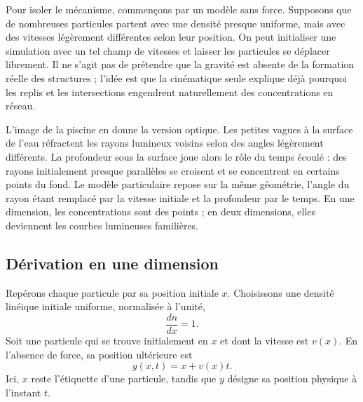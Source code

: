 Pour isoler le mécanisme, commençons par un modèle sans force. Supposons que de nombreuses particules partent avec une densité presque uniforme, mais avec des vitesses légèrement différentes selon leur position. On peut initialiser une simulation avec un tel champ de vitesses et laisser les particules se déplacer librement. Il ne s’agit pas de prétendre que la gravité est absente de la formation réelle des structures ; l’idée est que la cinématique seule explique déjà pourquoi les replis et les intersections engendrent naturellement des concentrations en réseau.

\begin{classroomqa}
\end{classroomqa}

L’image de la piscine en donne la version optique. Les petites vagues à la surface de l’eau réfractent les rayons lumineux voisins selon des angles légèrement différents. La profondeur sous la surface joue alors le rôle du temps écoulé : des rayons initialement presque parallèles se croisent et se concentrent en certains points du fond. Le modèle particulaire repose sur la même géométrie, l’angle du rayon étant remplacé par la vitesse initiale et la profondeur par le temps. En une dimension, les concentrations sont des points ; en deux dimensions, elles deviennent les courbes lumineuses familières.

\subsection{Dérivation en une dimension}

Repérons chaque particule par sa position initiale \(x\). Choisissons une densité linéique initiale uniforme, normalisée à l’unité,
\begin{equation}
\frac{dn}{dx}=1.
\label{eq:c09-initial-density}
\end{equation}
Soit une particule qui se trouve initialement en \(x\) et dont la vitesse est \(v(x)\). En l’absence de force, sa position ultérieure est
\begin{equation}
y(x,t)=x+v(x)t.
\label{eq:c09-ballistic-map}
\end{equation}
Ici, \(x\) reste l’étiquette d’une particule, tandis que \(y\) désigne sa position physique à l’instant \(t\).

